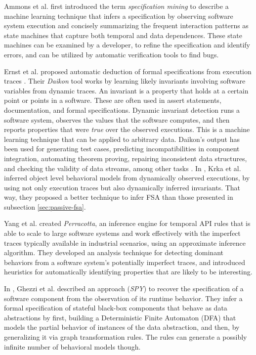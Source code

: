 Ammons et al. first introduced the term \textit{specification
mining} \cite{Ammons:2002:MS:565816.503275} to describe a machine
learning technique that infers a specification by observing
software system execution and concisely summarizing the frequent
interaction patterns as state machines that capture both temporal
and data dependences. These state machines can be examined by a
developer, to refine the specification and identify errors, and
can be utilized by automatic verification tools to find bugs.

Ernst et al. proposed automatic deduction of formal
specifications from execution traces
\cite{Ernst:1999:DDL:302405.302467}. Their \textit{Daikon} tool
works by learning likely invariants involving software variables
from dynamic traces. An invariant is a property that holds at a
certain point or points in a software. These are often used in
assert statements, documentation, and formal specifications.
Dynamic invariant detection runs a software system, observes the
values that the software computes, and then reports properties
that were \textit{true} over the observed executions.  This is a
machine learning technique that can be applied to arbitrary data.
Daikon's output has been used for generating test cases,
predicting incompatibilities in component integration, automating
theorem proving, repairing inconsistent data structures, and
checking the validity of data streams, among other tasks
\cite{Ernst200735}.  In \cite{Krka:2010:UDE:1810295.1810324},
Krka et al. inferred object level behavioral models from
dynamically observed executions, by using not only execution
traces but also dynamically inferred invariants. That way, they
proposed a better technique to infer FSA than those presented in
subsection \ref{sec:passive-fsa}.

Yang et al. \cite{Yang:2006:PMT:1134285.1134325} created
\textit{Perracotta}, an inference engine for temporal API rules
that is able to scale to large software systems and work
effectively with the imperfect traces typically available in
industrial scenarios, using an approximate inference algorithm.
They developed an analysis technique for detecting dominant
behaviors from a software system's potentially imperfect traces,
and introduced heuristics for automatically identifying
properties that are likely to be interesting.

In \cite{Ghezzi:2009:SIB:1555001.1555057}, Ghezzi et al.
described an approach (\textit{SPY}) to recover the specification
of a software component from the observation of its runtime
behavior. They infer a formal specification of stateful black-box
components that behave as data abstractions by first, building a
Deterministic Finite Automaton (DFA) that models the partial
behavior of instances of the data abstraction, and then, by
generalizing it via graph transformation rules. The rules can
generate a possibly infinite number of behavioral models though.

